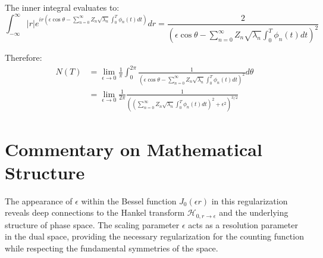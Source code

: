 \documentclass{article}
\begin{document}
The inner integral evaluates to:
\begin{equation}
    \int_{-\infty}^{\infty} |r| e^{ir(\epsilon\cos\theta - \sum_{n=0}^{\infty} Z_n \sqrt{\lambda_n} \int_0^T \phi_n(t) dt)} dr = \frac{2}{(\epsilon\cos\theta - \sum_{n=0}^{\infty} Z_n \sqrt{\lambda_n} \int_0^T \phi_n(t) dt)^2}
\end{equation}

Therefore:
\begin{equation}
\begin{split}
    N(T) &= \lim_{\epsilon \to 0} \frac{1}{\pi} \int_0^{2\pi} \frac{1}{(\epsilon\cos\theta - \sum_{n=0}^{\infty} Z_n \sqrt{\lambda_n} \int_0^T \phi_n(t) dt)^2} d\theta \\
    &= \lim_{\epsilon \to 0} \frac{1}{2\pi} \frac{1}{((\sum_{n=0}^{\infty} Z_n \sqrt{\lambda_n} \int_0^T \phi_n(t) dt)^2 + \epsilon^2)^{3/2}}
\end{split}
\end{equation}

\section*{Commentary on Mathematical Structure}
The appearance of $\epsilon$ within the Bessel function $J_0(\epsilon r)$ in this regularization reveals deep connections to the Hankel transform $\mathcal{H}_{0,r\to\epsilon}$ and the underlying structure of phase space. The scaling parameter $\epsilon$ acts as a resolution parameter in the dual space, providing the necessary regularization for the counting function while respecting the fundamental symmetries of the space.
\end{document}
